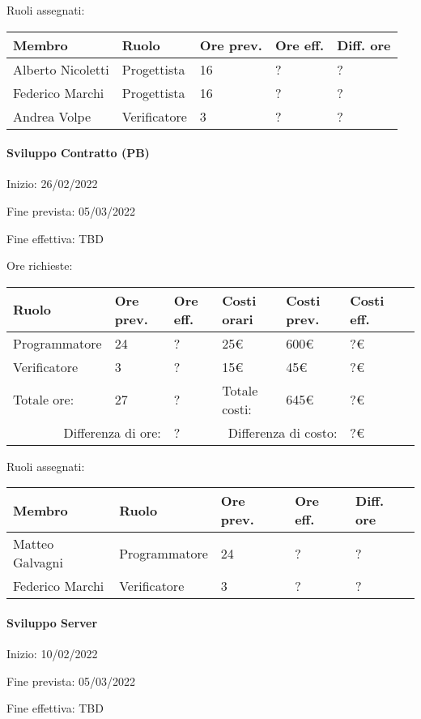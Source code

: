 \documentclass[a4paper, 12pt]{article}
\begin{document}
Ruoli assegnati:\\[0.5em]
\begin{tabular}{|l|l|l|l|l|}\hline
Membro & Ruolo & Ore prev. & Ore eff. & Diff. ore \\\hline
Alberto Nicoletti & Progettista & 16 & ? & ? \\\hline
Federico Marchi & Progettista & 16 & ? & ? \\\hline
Andrea Volpe & Verificatore & 3 & ? & ? \\\hline
\end{tabular}

\paragraph{Sviluppo Contratto (PB)}
Inizio: 26/02/2022\par
Fine prevista: 05/03/2022\par
Fine effettiva: TBD

Ore richieste:\\[0.5em]
\begin{tabular}{|l|l|l||l|l|l|l|}\hline
Ruolo & Ore prev. & Ore eff. & Costi orari & Costi prev. & Costi eff.\\\hline
Programmatore & 24 & ? & 25\euro & 600\euro & ?\euro \\\hline
Verificatore & 3 & ? & 15\euro & 45\euro & ?\euro \\\hline
Totale ore: & 27 & ? & Totale costi: & 645\euro & ?\euro \\\hline
\multicolumn{2}{|r|}{Differenza di ore:} & ? & \multicolumn{2}{r|}{Differenza di costo:} & ?\euro \\\hline
\end{tabular}

Ruoli assegnati:\\[0.5em]
\begin{tabular}{|l|l|l|l|l|}\hline
Membro & Ruolo & Ore prev. & Ore eff. & Diff. ore \\\hline
Matteo Galvagni & Programmatore & 24 & ? & ? \\\hline
Federico Marchi & Verificatore & 3 & ? & ? \\\hline
\end{tabular}

\paragraph{Sviluppo Server}
Inizio: 10/02/2022\par
Fine prevista: 05/03/2022\par
Fine effettiva: TBD
\end{document}
